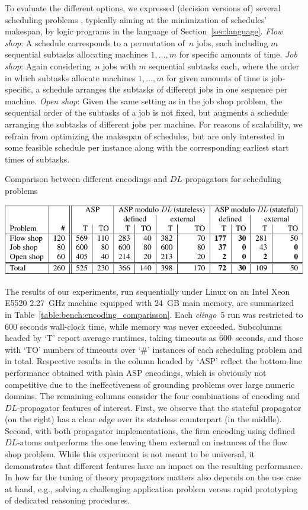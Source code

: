 \documentclass[a4paper,USenglish]{oasics-v2016}
\newcommand{\DL}{\ensuremath{\mathit{DL}}}
\newcommand{\sysfont}{\textit}
\newcommand{\clingo}{\sysfont{clingo}}
\begin{document}
To evaluate the different options,
we expressed (decision versions of) several scheduling problems \cite{taillard93a},
typically aiming at the minimization of schedules' makespan,
by logic programs in the language of Section~\ref{sec:language}.
%
\emph{Flow shop}:
A schedule corresponds to a permutation of~$n$ jobs,
each including $m$ sequential subtasks allocating
machines $1,\dots, m$ for specific amounts of time.
%
\emph{Job shop}:
Again considering~$n$ jobs with $m$ sequential subtasks each,
where the order in which subtasks allocate machines $1,\dots, m$ for given amounts of time
is job-specific,
a schedule arranges the subtasks of different jobs in one sequence per machine.
%
\emph{Open shop}:
Given the same setting as in the job shop problem,
the sequential order of the subtasks of a job is not fixed,
but augments a schedule arranging the subtasks of different jobs per machine.
%
For reasons of scalability,
we refrain from optimizing the makespan of schedules,
but are only interested in some feasible schedule per instance along with
the corresponding earliest start times of subtasks.

\begin{table}
\caption{Comparison between different encodings and \DL-propagators for scheduling problems}
\centering
\includegraphics{tables/shop-scheduling}
\label{table:bench:encoding_comparisson}
\end{table}
The results of our experiments,
run sequentially under Linux on an Intel Xeon E5520 2.27~GHz machine equipped with 24~GB main memory,
are summarized in Table~\ref{table:bench:encoding_comparisson}.
%
%
Each \clingo~5 run was restricted to 600 seconds wall-clock time, while memory was never exceeded.
%
Subcolumns headed by  `T'  report average runtimes, taking timeouts as 600~seconds, and
those with  `TO'  numbers of timeouts over  `\#'  instances of each scheduling problem and
in total.
Respective results in the column headed by  `ASP'
reflect the bottom-line performance obtained with plain ASP encodings,
which is obviously not competitive due to the ineffectiveness of grounding
problems over large numeric domains.
%
The remaining columns consider the four combinations of encoding and \DL-propagator features of interest.
%
First,
we observe that the stateful propagator (on the right) has a clear edge over its stateless counterpart
(in the middle).
Second,
with both propagator implementations,
the firm encoding using defined \DL-atoms outperforms the one leaving them external
on instances of the flow shop problem.
%
While this experiment is not meant to be universal,
it demonstrates that different features have an impact on the resulting performance.
%
In how far the tuning of theory propagators matters also depends on the use case at hand, e.g.,
solving a challenging application problem  versus rapid prototyping of dedicated reasoning procedures.
\end{document}
